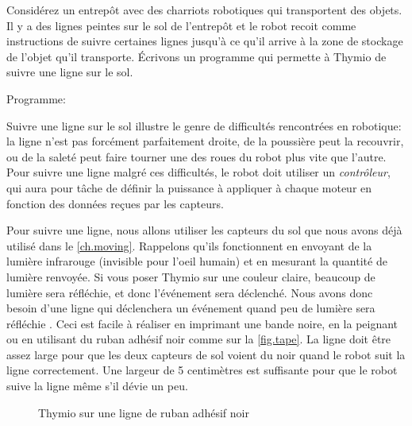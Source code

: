 \label{ch.line}

Considérez un entrepôt avec des charriots robotiques qui transportent des objets.
Il y a des lignes peintes sur le sol de l'entrepôt et le robot recoit comme instructions de suivre certaines lignes jusqu'à ce qu'il arrive à la zone de stockage de l'objet qu'il transporte.
Écrivons un programme qui permette à Thymio de suivre une ligne sur le sol.

{\raggedleft \hfill Programme: }

Suivre une ligne sur le sol illustre le genre de difficultés rencontrées en robotique:
la ligne n'est pas forcément parfaitement droite,
de la poussière peut la recouvrir, ou de la saleté peut faire tourner une des roues du robot plus vite que l'autre.
Pour suivre une ligne malgré ces difficultés,
le robot doit utiliser un \emph{contrôleur}, qui aura pour tâche de définir la puissance à appliquer à chaque moteur en fonction des données reçues par les capteurs.


Pour suivre une ligne, nous allons utiliser les capteurs du sol que nous avons déjà utilisé dans le \cref{ch.moving}.
Rappelons qu'ils fonctionnent en envoyant de la lumière infrarouge (invisible pour l'oeil humain) et en mesurant la quantité de lumière renvoyée.
Si vous poser Thymio sur une couleur claire, beaucoup de lumière sera réfléchie, et donc l'événement  sera déclenché.
Nous avons donc besoin d'une ligne qui déclenchera un événement quand peu de lumière sera réfléchie .
Ceci est facile à réaliser en imprimant une bande noire, en la peignant ou en utilisant du ruban adhésif noir comme sur la \cref{fig.tape}.
La ligne doit être assez large pour que les deux capteurs de sol voient du noir quand le robot suit la ligne correctement.
Une largeur de 5 centimètres est suffisante pour que le robot suive la ligne même s'il dévie un peu.

\begin{figure}
    \hfill
    \caption{Thymio sur une ligne de ruban adhésif noir}
\end{figure}


